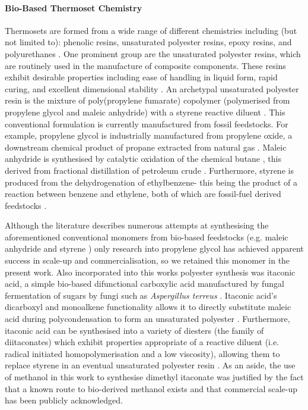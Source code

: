 \paragraph{Bio-Based Thermoset Chemistry}
Thermosets are formed from a wide range of different chemistries
 including (but not limited to): phenolic resins, unsaturated polyester
 resins, epoxy resins, and polyurethanes \autocite{Goodman1986}.
One prominent group are the unsaturated polyester resins, which are
 routinely used in the manufacture of composite components.
These resins exhibit desirable properties including ease of handling in
 liquid form, rapid curing, and excellent dimensional stability
 \autocite{Aziz2005,Lawrence1960}.
An archetypal unsaturated polyester resin is the mixture of 
 poly(propylene fumarate) copolymer (polymerised 
 from propylene glycol and maleic anhydride) with a styrene reactive 
 diluent \autocite{Ahamad2001}.
This conventional formulation is currently manufactured from fossil
 feedstocks.
For example, propylene glycol is industrially manufactured from
 propylene oxide, a downstream chemical product of propane extracted
 from natural gas \autocite{Levi2018}.
Maleic anhydride is synthesised by catalytic oxidation
 of the chemical butane \autocite{Felthouse2001}, this derived from 
 fractional distillation of petroleum crude \autocite{Kissin1987}.
Furthermore, styrene is produced from the dehydrogenation of 
 ethylbenzene- this being the product of a reaction between
 benzene and ethylene, both of which are fossil-fuel derived
 feedstocks \autocite{Lee2008,Levi2018}.

Although the literature describes numerous attempts at synthesising the
 aforementioned conventional monomers from bio-based feedstocks
 (e.g. maleic anhydride \autocite{Pavarelli2015,Li2016,Teong2014} and
 styrene \autocite{McKenna2011}) only research into propylene glycol
 \autocite{Dasari2005,Ricciardi2017,Berlowska2015,Xiao2015} has
 achieved apparent success in scale-up and commercialisation, so
 we retained this monomer in the present work.
Also incorporated into this works polyester synthesis was
 itaconic acid, a simple bio-based
 difunctional carboxylic acid manufactured by fungal
 fermentation of sugars by fungi such as 
 \textit{Aspergillus terreus} \autocite{Bafana2017}.
Itaconic acid's dicarboxyl and monoalkene functionality
 allows it to directly substitute maleic acid during
 polycondensation to form an unsaturated polyester 
 \autocite{Bamane2020}.
Furthermore, itaconic acid can be synthesised into a
 variety of diesters (the family of diitaconates) which
 exhibit properties appropriate
 of a reactive diluent (i.e. radical initiated
 homopolymerisation and a low viscosity), allowing
 them to replace styrene in an eventual unsaturated
 polyester resin \autocite{Sollka2020}.
As an aside, the use of methanol in this work to synthesise
 dimethyl itaconate was justified by the fact that a known
 route to bio-derived methanol exists \autocite{Gautam2020}
 and that commercial scale-up has been publicly acknowledged.

